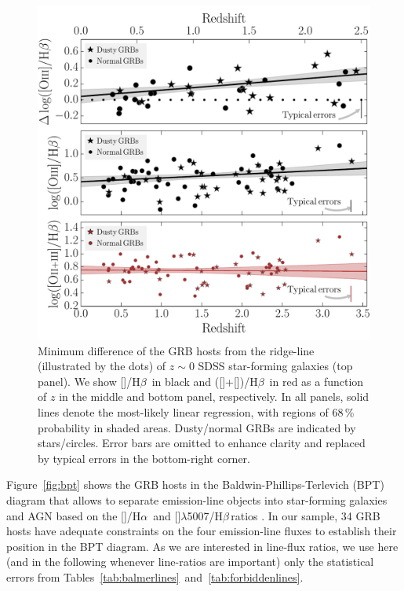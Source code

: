\documentclass[traditabstract, longauth]{aa}
\newcommand{\hb}{H$\beta$}
\newcommand{\ha}{H$\alpha$}
\newcommand{\oii}{[\ion{O}{ii}]}
\newcommand{\oiii}{[\ion{O}{iii}]}
\newcommand{\nii}{[\ion{N}{ii}]}
\begin{document}
\begin{figure}
\includegraphics[angle=0, width=0.99\columnwidth]{Figs/BPT_dist.pdf}
\caption{Minimum difference of the GRB hosts from the ridge-line (illustrated by the dots) of $z\sim0$ SDSS star-forming galaxies (top panel). We show \oiii/\hb\, in black and (\oiii+\oii)/\hb\, in red as a function of $z$ in the middle and bottom panel, respectively. In all panels, solid lines denote the most-likely linear regression, with regions of 68\,\% probability in shaded areas. Dusty/normal GRBs are indicated by stars/circles. Error bars are omitted to enhance clarity and replaced by typical errors in the bottom-right corner.}
\label{fig:bptdist}
\end{figure}

Figure~\ref{fig:bpt} shows the GRB hosts in the Baldwin-Phillips-Terlevich (BPT) diagram \citep{1981PASP...93....5B} that allows to separate emission-line objects into star-forming galaxies and AGN based on the \nii/\ha\, and \oiii$\lambda$5007/\hb\,ratios \citep[e.g.,][]{2001ApJ...556..121K}. In our sample, 34 GRB hosts have adequate constraints on the four emission-line fluxes to establish their position in the BPT diagram. As we are interested in line-flux ratios, we use here (and in the following whenever line-ratios are important) only the statistical errors from Tables~\ref{tab:balmerlines}~and~\ref{tab:forbiddenlines}.
\end{document}
